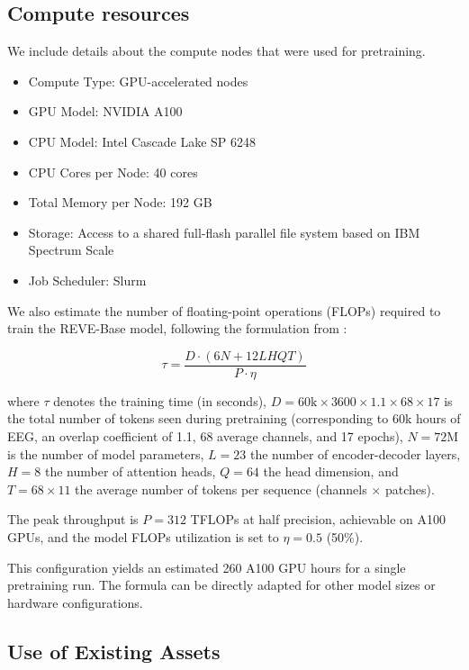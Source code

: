 \documentclass{article}
\begin{document}
\subsection{Compute resources}

We include details about the compute nodes that were used for pretraining.

\begin{itemize}
    \item Compute Type: GPU-accelerated nodes
    \item GPU Model: NVIDIA A100
    \item CPU Model: Intel Cascade Lake SP 6248
    \item CPU Cores per Node: 40 cores
    \item Total Memory per Node: 192 GB
    \item Storage: Access to a shared full-flash parallel file system based on IBM Spectrum Scale
    \item Job Scheduler: Slurm
\end{itemize}



We also estimate the number of floating-point operations (FLOPs) required to train the REVE-Base model, following the formulation from \citet{chowdhery2023palm}:

\[
\tau =  \frac{D \cdot (6N + 12LHQT)}{P \cdot \eta}
\]

where
\(\tau\) denotes the training time (in seconds),
\(D = 60\text{k} \times 3600 \times 1.1 \times 68 \times 17\) is the total number of tokens seen during pretraining (corresponding to 60k hours of EEG, an overlap coefficient of 1.1, 68 average channels, and 17 epochs),
\(N = 72\text{M}\) is the number of model parameters,
\(L = 23\) the number of encoder-decoder layers,
\(H = 8\) the number of attention heads,
\(Q = 64\) the head dimension,
and \(T = 68 \times 11\) the average number of tokens per sequence (channels × patches).

The peak throughput is \(P = 312\) TFLOPs at half precision, achievable on A100 GPUs, and the model FLOPs utilization is set to \(\eta = 0.5\) (50\%).

This configuration yields an estimated 260 A100 GPU hours for a single pretraining run. The formula can be directly adapted for other model sizes or hardware configurations.


\subsection{Use of Existing Assets}
\end{document}
